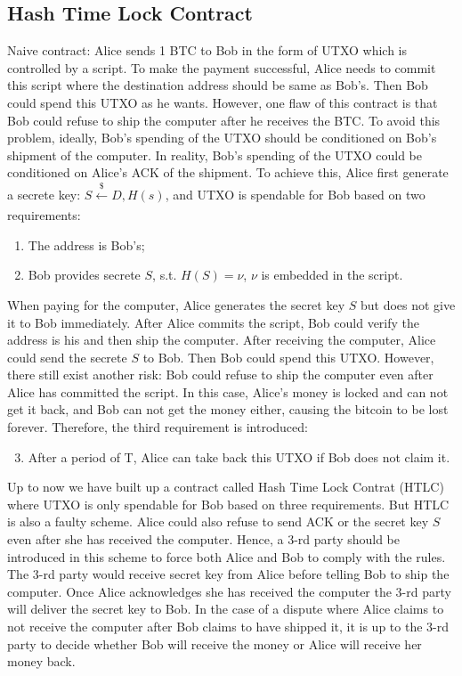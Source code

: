 \documentclass[twoside]{article}
\begin{document}
\subsection{Hash Time Lock Contract}
Naive contract: Alice sends 1 BTC to Bob in the form of UTXO which is controlled by a script. To make the payment successful, Alice needs to commit this script where the destination address should be same as Bob's. Then Bob could spend this UTXO as he wants. However, one flaw of this contract is that Bob could refuse to ship the computer after he receives the BTC.
To avoid this problem, ideally, Bob's spending of the UTXO should be conditioned on Bob's shipment of the computer. In reality, Bob's spending of the UTXO could be conditioned on Alice's ACK of the shipment. To achieve this, Alice first generate a secrete key: $S \xleftarrow[]{\$ } D , H(s)$, and UTXO is spendable for Bob based on two requirements:
\begin{enumerate}
\item The address is Bob's;
\item Bob provides secrete $S$, s.t. $H(S) = \nu$, $\nu$ is embedded in the script.
\end{enumerate}
When paying for the computer, Alice generates the secret key $S$ but does not give it to Bob immediately. After Alice commits the script, Bob could verify the address is his and then ship the computer. After receiving the computer, Alice could send the secrete $S$ to Bob. Then Bob could spend this UTXO. 
However, there still exist another risk: Bob could refuse to ship the computer even after Alice has committed the script. In this case, Alice's money is locked and can not get it back, and Bob can not get the money either, causing the bitcoin to be lost forever. Therefore, the third requirement is introduced:
\begin{enumerate}
\setcounter{enumi}{2}
\item After a period of T, Alice can take back this UTXO if Bob does not claim it.
\end{enumerate}
Up to now we have built up a contract called Hash Time Lock Contrat (HTLC) where UTXO is only spendable for Bob based on three requirements.
But HTLC is also a faulty scheme. Alice could also refuse to send ACK or the secret key $S$ even after she has received the computer. Hence, a 3-rd party should be introduced in this scheme to force both Alice and Bob to comply with the rules. The 3-rd party would receive secret key from Alice before telling Bob to ship the computer. Once Alice acknowledges she has received the computer the 3-rd party will deliver the secret key to Bob. In the case of a dispute where Alice claims to not receive the computer after Bob claims to have shipped it, it is up to the 3-rd party to decide whether Bob will receive the money or Alice will receive her money back.
\end{document}
